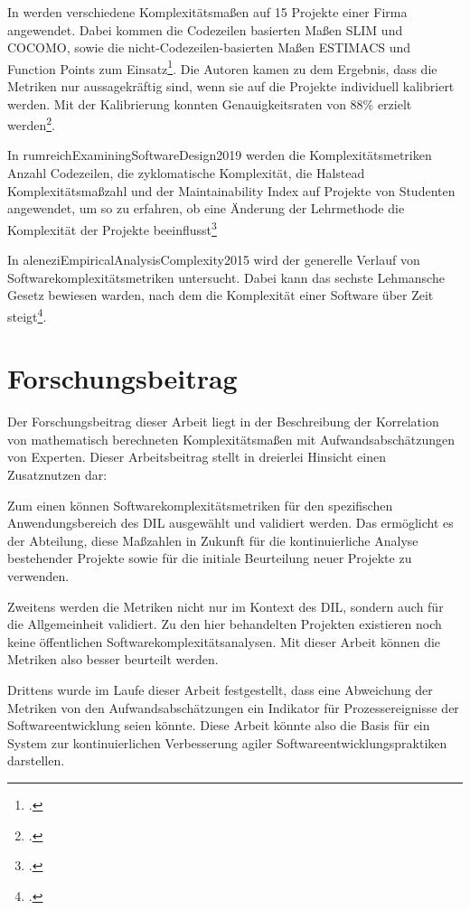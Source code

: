 In \cite[][]{kemererEmpiricalValidationSoftware1987} werden verschiedene
Komplexitätsmaßen auf 15 Projekte einer Firma angewendet. Dabei kommen
die Codezeilen basierten Maßen SLIM und COCOMO, sowie die
nicht-Codezeilen-basierten Maßen ESTIMACS und Function Points zum
Einsatz\footcite[Vgl. ][S. 2]{kemererEmpiricalValidationSoftware1987}. Die Autoren kamen zu dem Ergebnis, dass
die Metriken nur aussagekräftig sind, wenn sie auf die Projekte
individuell kalibriert werden. Mit der Kalibrierung konnten
Genauigkeitsraten von 88\% erzielt werden\footcite[Vgl. ][S. 12]{kemererEmpiricalValidationSoftware1987}.

In rumreichExaminingSoftwareDesign2019 werden die Komplexitätsmetriken
Anzahl Codezeilen, die zyklomatische Komplexität, die Halstead
Komplexitätsmaßzahl und der Maintainability Index auf Projekte von
Studenten angewendet, um so zu erfahren, ob eine Änderung der
Lehrmethode die Komplexität der Projekte beeinflusst\footcite[Vgl. ][S. 1]{rumreichExaminingSoftwareDesign2019}

In aleneziEmpiricalAnalysisComplexity2015 wird der generelle Verlauf von
Softwarekomplexitätsmetriken untersucht. Dabei kann das sechste
Lehmansche Gesetz bewiesen warden, nach dem die Komplexität einer
Software über Zeit steigt\footcite[Vgl. ][S. 262]{aleneziEmpiricalAnalysisComplexity2015}.

\section{Forschungsbeitrag}\label{forschungsbeitrag}

Der Forschungsbeitrag dieser Arbeit liegt in der Beschreibung der
Korrelation von mathematisch berechneten Komplexitätsmaßen mit
Aufwandsabschätzungen von Experten. Dieser Arbeitsbeitrag stellt in
dreierlei Hinsicht einen Zusatznutzen dar:

Zum einen können Softwarekomplexitätsmetriken für den spezifischen
Anwendungsbereich des DIL ausgewählt und validiert werden. Das
ermöglicht es der Abteilung, diese Maßzahlen in Zukunft für die
kontinuierliche Analyse bestehender Projekte sowie für die initiale
Beurteilung neuer Projekte zu verwenden.

Zweitens werden die Metriken nicht nur im Kontext des DIL, sondern auch
für die Allgemeinheit validiert. Zu den hier behandelten Projekten
existieren noch keine öffentlichen Softwarekomplexitätsanalysen. Mit
dieser Arbeit können die Metriken also besser beurteilt werden.

Drittens wurde im Laufe dieser Arbeit festgestellt, dass eine Abweichung
der Metriken von den Aufwandsabschätzungen ein Indikator für
Prozessereignisse der Softwareentwicklung seien könnte. Diese Arbeit
könnte also die Basis für ein System zur kontinuierlichen Verbesserung
agiler Softwareentwicklungspraktiken darstellen.

